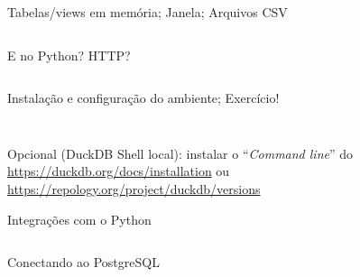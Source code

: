 \documentclass[utf8]{beamer}
\begin{document}
\begin{frame}[fragile]{Tabelas/views em memória; Janela; Arquivos CSV}
  \vspace{-.8em}%
  \inputminted[firstline=23, lastline=50]{sql}{01_intro.sql}
\end{frame}


\begin{frame}[fragile]{E no Python? HTTP?}
  \vspace{-.8em}%
  \inputminted{python}{02_intro.py}
\end{frame}


\begin{frame}[fragile]{Instalação e configuração do ambiente;
                       Exercício!}
  \vspace{-.8em}%
  \inputminted{bash}{03_install.sh}
  \vspace{-2.8em}%
  \inputminted{python}{04_jupysql.py}
  Opcional (DuckDB Shell local): instalar o ``\emph{Command line}'' do
  \url{https://duckdb.org/docs/installation} \qquad ou
  \url{https://repology.org/project/duckdb/versions}
\end{frame}


\begin{frame}[fragile]{Integrações com o Python}
  \inputminted{python}{05_integrations.py}
\end{frame}


\begin{frame}[fragile]{Conectando ao PostgreSQL}
  \vspace{-.8em}%
  \inputminted{python}{06_database.sh}
  \vspace{-2.8em}%
  \inputminted{python}{07_postgres.py}
\end{frame}
\end{document}
